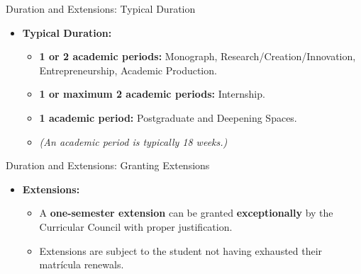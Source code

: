           \begin{frame}{Duration and Extensions: Typical Duration}
            \begin{itemize}
              \item<1-> \textbf{Typical Duration:}
                \begin{itemize}
                  \item<2-> \textbf{1 or 2 academic periods:} Monograph, Research/Creation/Innovation, Entrepreneurship, Academic Production.
                  \item<3-> \textbf{1 or maximum 2 academic periods:} Internship.
                  \item<4-> \textbf{1 academic period:} Postgraduate and Deepening Spaces.
                  \item<5-> \textit{(An academic period is typically 18 weeks.)}
                \end{itemize}
            \end{itemize}
          \end{frame}

          \begin{frame}{Duration and Extensions: Granting Extensions}
            \begin{itemize}
              \item<1-> \textbf{Extensions:}
                \begin{itemize}
                  \item<2-> A \textbf{one-semester extension} can be granted \textbf{exceptionally} by the Curricular Council with proper justification.
                  \item<3-> Extensions are subject to the student not having exhausted their matrícula renewals.
                \end{itemize}
            \end{itemize}
          \end{frame}



